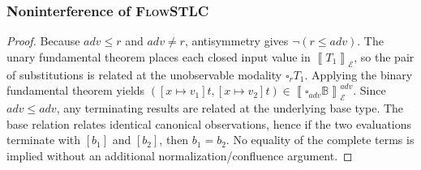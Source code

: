 \documentclass[conference]{IEEEtran}
\newcommand\gradedt[2]{\square_{#1} #2}
\newcommand\cale{\mathcal{E}}
\newcommand\bbrac[1]{\left\llbracket #1\right\rrbracket}
\newcommand\base{\mathbb{B}}
\begin{document}
\subsubsection{Noninterference of \textsc{FlowSTLC}}

\begin{proof}
	Because $adv\le r$ and $adv\ne r$, antisymmetry gives $\neg(r\le adv)$. The unary fundamental theorem places each closed input value in $\bbrac{T_1}_\cale$, so the pair of substitutions is related at the unobservable modality $\gradedt{r}{T_1}$. Applying the binary fundamental theorem yields
	$([x\mapsto v_1]t,[x\mapsto v_2]t)\in\bbrac{\gradedt{adv}{\base}}^{adv}_\cale$.
	Since $adv\le adv$, any terminating results are related at the underlying base type. The base relation relates identical canonical observations, hence if the two evaluations terminate with $[b_1]$ and $[b_2]$, then $b_1=b_2$. No equality of the complete terms is implied without an additional normalization/confluence argument.
\end{proof}
\end{document}
